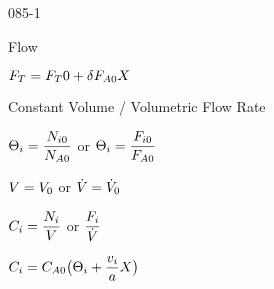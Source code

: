 \begin{mitframe}{085-1}
\begin{listone}
\begin{listtwo}
\begin{listthree}
\begin{listfour}
\begin{listfive}
                                \end{listfive}
                            
                            \end{listfour}
                    
                    \end{listthree}
        	
            \item Flow
            
            			\begin{listthree}
                        
                        		\item $\force_{\Temp}=\force_{\Temp}0+\blthick\force_{\helmholtz{0}}X$
                        
                        \end{listthree}
        
        \end{listtwo}

\item Constant Volume / Volumetric Flow Rate

		\begin{listtwo}
        
        		\item $\dimltemp_{\state}=\dfrac{\nummoles_{\state{0}}}{\nummoles_{\helmholtz{0}}}$ or $\dimltemp_{\state}=\dfrac{\force_{\state{0}}}{\force_{\helmholtz{0}}}$
                
                \item $\vol=\vol_0$ or $\dot{\vol}=\dot{\vol}_0$
                
                \item $\conc_{\state}=\dfrac{\massspecflux{i}}{\vol}$ or $\dfrac{\force_{\state}}{\dot{\vol}}$
                
                \item $\conc_{\state}=\conc_{\helmholtz{0}}\big(\dimltemp_{\state}+\dfrac{\vvel_{\state}}{\activity}X\big)$
        \end{listtwo}
\end{listone}

\end{mitframe}